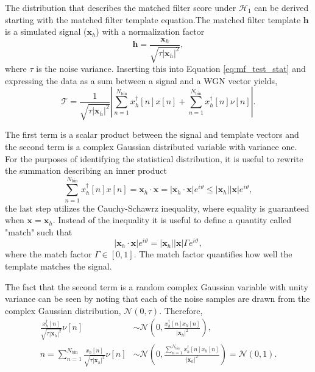 The distribution that describes the matched filter score under $\mathcal{H}_1$ can be derived starting with the matched filter template equation.The matched filter template $\mathbf{h}$ is a simulated signal ($\mathbf{x}_h$) with a normalization factor
\begin{equation}
    \mathbf{h}=\frac{\mathbf{x}_h}{\sqrt{\tau|\mathbf{x}_h|^2}},
    \label{eq:appendix-mf-template}
\end{equation}
where $\tau$ is the noise variance. Inserting this into Equation \ref{eq:mf_test_stat} and expressing the data as a sum between a signal and a WGN vector yields,
\begin{equation}
    \mathcal{T}=\frac{1}{\sqrt{\tau|\mathbf{x}_h|^2}}\left|\sum_{n=1}^{N_\mathrm{bin}}{x_h^\dagger[n]x[n]} + \sum_{n=1}^{N_\mathrm{bin}}{x_h^\dagger[n]\nu[n]}\right|.
    \label{eq:appendix-eqn-1}
\end{equation}

The first term is a scalar product between the signal and template vectors and the second term is a complex Gaussian distributed variable with variance one. For the purposes of identifying the statistical distribution, it is useful to rewrite the summation describing an inner product 
\begin{equation}
    \sum_{n=1}^{N_\mathrm{bin}}{x_h^\dagger[n]x[n]}=\mathbf{x}_h\cdot\mathbf{x}=|\mathbf{x}_h\cdot\mathbf{x}|e^{i\vartheta}\leq|\mathbf{x}_h||\mathbf{x}|e^{i\vartheta},
\end{equation}
the last step utilizes the Cauchy-Schawrz inequality, where equality is guaranteed when $\mathbf{x}=\mathbf{x}_h$. Instead of the inequality it is useful to define a quantity called "match" such that 
\begin{equation}
    |\mathbf{x}_h\cdot\mathbf{x}|e^{i\vartheta}=|\mathbf{x}_h||\mathbf{x}|\Gamma e^{i\vartheta},
\end{equation}
where the match factor $\Gamma\in[0,1]$. The match factor quantifies how well the template matches the signal.

The fact that the second term is a random complex Gaussian variable with unity variance can be seen by noting that each of the noise samples are drawn from the complex Gaussian distribution, $\mathcal{N}(0,\tau)$. Therefore,
\begin{align}
    \frac{x_h^\dagger[n]}{\sqrt{\tau|\mathbf{x}_h|^2}}\nu[n]&\sim\mathcal{N}\left(0,\frac{x_h^\dagger[n]x_h[n]}{|\mathbf{x}_h|^2}\right),\\
    n=\sum_{n=1}^{N_\mathrm{bin}}{\frac{x_h[n]}{\sqrt{\tau|\mathbf{x}_h|^2}}\nu[n]}&\sim\mathcal{N}\left(0,\frac{\sum_{n=1}^{N_\mathrm{bin}}{x_h^\dagger[n]x_h[n]}}{|\mathbf{x}_h|^2}\right)=\mathcal{N}(0,1).
\end{align}


